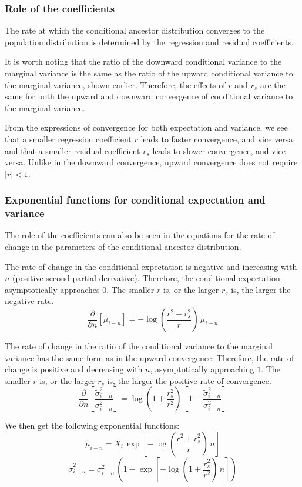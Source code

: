 \documentclass[letterpaper,10pt]{article} %
\begin{document}
\subsubsection*{Role of the coefficients}
The rate at which the conditional ancestor distribution converges to the population distribution is determined by the regression and residual coefficients. 

It is worth noting that the ratio of the downward conditional variance to the marginal variance is the same as the ratio of the upward conditional variance to the marginal variance, shown earlier. Therefore, the effects of $r$ and $r_s$ are the same for both the upward and downward convergence of conditional variance to the marginal variance.

From the expressions of convergence for both expectation and variance, we see that a smaller regression coefficient $r$ leads to faster convergence, and vice versa; and that a smaller residual coefficient $r_s$ leads to slower convergence, and vice versa. Unlike in the downward convergence, upward convergence does not require $|r| < 1$.

\subsubsection*{Exponential functions for conditional expectation and variance}
The role of the coefficients can also be seen in the equations for the rate of change in the parameters of the conditional ancestor distribution.

The rate of change in the conditional expectation is negative and increasing with $n$ (positive second partial derivative). Therefore, the conditional expectation asymptotically approaches $0$. The smaller $r$ is, or the larger $r_s$ is, the larger the negative rate. 
$$\frac{\partial}{\partial n}[\tilde{\mu}_{i-n}] = -\log(\frac{r^2 + r_s^2}{r}) \, \tilde{\mu}_{i-n}$$

The rate of change in the ratio of the conditional variance to the marginal variance has the same form as in the upward convergence. Therefore, the rate of change is positive and decreasing with $n$, asymptotically approaching $1$. The smaller $r$ is, or the larger $r_s$ is, the larger the positive rate of convergence.
$$\frac{\partial }{\partial n}[\frac{\tilde{\sigma}_{i-n}^2}{\sigma_{i-n}^2}] = \log(1+\frac{r_s^2}{r^2}) \, [1 - \frac{\tilde{\sigma}_{i-n}^2}{\sigma_{i-n}^2}]$$

We then get the following exponential functions:
$$\tilde{\mu}_{i-n} = X_i \, \exp[-\log(\frac{r^2 + r_s^2}{r}) \, n]$$
$$\tilde{\sigma}_{i-n}^2 = \sigma_{i-n}^2 \, (1 - \exp[-\log(1+\frac{r_s^2}{r^2}) \, n])$$
\end{document}

